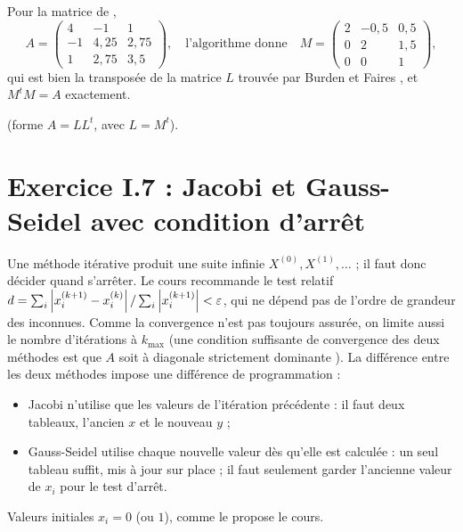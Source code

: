 \Verif Pour la matrice de ,
\[
  A = \begin{pmatrix} 4 & -1 & 1\\ -1 & 4{,}25 & 2{,}75\\ 1 & 2{,}75 & 3{,}5 \end{pmatrix},
  \quad\text{l'algorithme donne}\quad
  M = \begin{pmatrix} 2 & -0{,}5 & 0{,}5\\ 0 & 2 & 1{,}5\\ 0 & 0 & 1 \end{pmatrix},
\]
qui est bien la transposée de la matrice $L$ trouvée par Burden et Faires
, et $M^{t}M = A$ exactement.

\Refs {} (forme $A = LL^{t}$, avec $L = M^{t}$).

\section{Exercice I.7 : Jacobi et Gauss-Seidel avec condition d'arrêt}


\Pourquoi Une méthode itérative produit une suite infinie
$X^{(0)}, X^{(1)}, \dots$ ; il faut donc décider quand s'arrêter. Le cours
recommande le test relatif
$d = \sum_i\left|x_i^{(k+1)} - x_i^{(k)}\right|/\sum_i\left|x_i^{(k+1)}\right| < \varepsilon$,
qui ne dépend pas de l'ordre de grandeur des inconnues. Comme la convergence
n'est pas toujours assurée, on limite aussi le nombre d'itérations à $k_{\max}$
(une condition suffisante de convergence des deux méthodes est que $A$ soit à
diagonale strictement dominante ). La différence entre
les deux méthodes impose une différence de programmation :
\begin{itemize}
  \item Jacobi n'utilise que les valeurs de l'itération précédente : il faut
        deux tableaux, l'ancien $x$ et le nouveau $y$ ;
  \item Gauss-Seidel utilise chaque nouvelle valeur dès qu'elle est calculée :
        un seul tableau suffit, mis à jour sur place ; il faut seulement garder
        l'ancienne valeur de $x_i$ pour le test d'arrêt.
\end{itemize}

\Etapes
{} Valeurs initiales $x_i = 0$ (ou $1$), comme le propose le cours.

